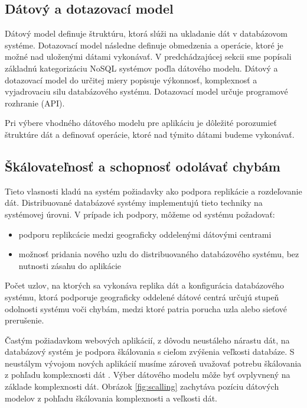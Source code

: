 \documentclass[11pt,twoside,a4paper]{book}
\begin{document}
\subsection{Dátový a dotazovací model}
Dátový model definuje štruktúru, ktorá slúži na ukladanie dát v databázovom systéme. Dotazovací model následne definuje obmedzenia a operácie, ktoré je možné nad uloženými dátami vykonávať. V predchádzajúcej sekcii sme popísali základnú kategorizáciu NoSQL systémov poďla dátového modelu. Dátový a dotazovací model do určitej miery popisuje výkonnosť, komplexnosť a vyjadrovaciu silu databázového systému. Dotazovací model určuje programové rozhranie (API).

Pri výbere vhodného dátového modelu pre aplikáciu je dôležité porozumieť štruktúre dát a definovať operácie, ktoré nad týmito dátami budeme vykonávať.

\subsection{Škálovateľnosť a schopnosť odolávať chybám}
Tieto vlasnosti kladú na systém požiadavky ako podpora replikácie a rozdeľovanie dát. Distribuované databázové systémy implementujú tieto techniky na systémovej úrovni. V prípade ich podpory, môžeme od systému požadovať:
\begin{itemize}
  \item
  podporu replikcácie medzi geograficky oddelenými dátovými centrami
  \item
  možnosť pridania nového uzlu do distribuovaného databázového systému, bez nutnosti zásahu do aplikácie
\end{itemize}

Počet uzlov, na ktorých sa vykonáva replika dát a konfigurácia databázového systému, ktorá podporuje geograficky oddelené dátové centrá určujú stupeň odolnosti systému voči chybám, medzi ktoré patria porucha uzla alebo sieťové prerušenie.

Častým požiadavkom webových aplikácií, z dôvodu neustáleho nárastu dát, na databázový systém je podpora škálovania s cieľom zvýšenia veľkosti databáze. S neustálym vývojom nových aplikácií musíme zároveň uvažovať potrebu škálovania z pohľadu komplexnosti dát \cite{segaran2009beautiful}. Výber dátového modelu môže byť ovplyvnený na základe komplexnosti dát. Obrázok \ref{fig:scalling} zachytáva pozíciu dátových modelov z pohľadu škálovania komplexnosti a veľkosti dát.

\end{document}
